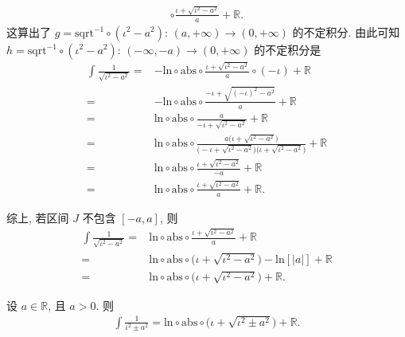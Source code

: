 \begin{example}
\begin{align*}
        \circ \frac{\iota + \sqrt{\iota^2 - a^2}}{a} + \mathbb{R}.
    \end{align*}
    这算出了 $g = \mathrm{sqrt}^{-1} \circ (\iota^2 - a^2)$: $(a, +\infty) \to (0, +\infty)$ 的不定积分. 由此可知 $h = \mathrm{sqrt}^{-1} \circ (\iota^2 - a^2)$: $(-\infty, -a) \to (0, +\infty)$ 的不定积分是
    \begin{align*}
        \int {\frac{1}{\sqrt{\iota^2 - a^2}}}
        = {} & {-\mathrm{ln}} \circ \mathrm{abs}
        \circ \frac{\iota + \sqrt{\iota^2 - a^2}}{a} \circ (-\iota)
        + \mathbb{R}                                          \\
        = {} & {-\mathrm{ln}} \circ \mathrm{abs}
        \circ \frac{-\iota + \sqrt{(-\iota)^2 - a^2}}{a}
        + \mathbb{R}                                          \\
        = {} & \mathrm{ln} \circ \mathrm{abs}
        \circ \frac{a}{-\iota + \sqrt{\iota^2 - a^2}}
        + \mathbb{R}                                          \\
        = {} & \mathrm{ln} \circ \mathrm{abs}
        \circ \frac{a \big(\iota + \sqrt{\iota^2 - a^2} \big)}
        {\big(-\iota + \sqrt{\iota^2 - a^2} \big)
        \big(\iota + \sqrt{\iota^2 - a^2} \big)} + \mathbb{R} \\
        = {} & \mathrm{ln} \circ \mathrm{abs}
        \circ \frac{\iota + \sqrt{\iota^2 - a^2}}{-a}
        + \mathbb{R}                                          \\
        = {} & \mathrm{ln} \circ \mathrm{abs}
        \circ \frac{\iota + \sqrt{\iota^2 - a^2}}{a}
        + \mathbb{R}.
    \end{align*}

    综上, 若区间 $J$ 不包含 $[-a, a]$, 则
    \begin{align*}
        \int {\frac{1}{\sqrt{\iota^2 - a^2}}}
        = {} & \mathrm{ln} \circ \mathrm{abs}
        \circ \frac{\iota + \sqrt{\iota^2 - a^2}}{a}
        + \mathbb{R}                          \\
        = {} & \mathrm{ln} \circ \mathrm{abs}
        \circ \big( \iota + \sqrt{\iota^2 - a^2} \big)
        - \mathrm{ln}[|a|] + \mathbb{R}       \\
        = {} & \mathrm{ln} \circ \mathrm{abs}
        \circ \big( \iota + \sqrt{\iota^2 - a^2} \big)
        + \mathbb{R}.
    \end{align*}
\end{example}

\begin{remark}
    设 $a \in \mathbb{R}$, 且 $a > 0$. 则
    \begin{align*}
        \int {\frac{1}{\iota^2 \pm a^2}} = \mathrm{ln} \circ \mathrm{abs} \circ \big( \iota + \sqrt{\iota^2 \pm a^2} \big) + \mathbb{R}.
    \end{align*}
\end{remark}

